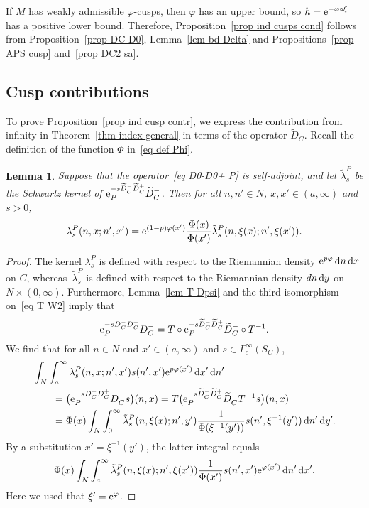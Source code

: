\documentclass[pdftex]{sigma}%
\numberwithin{equation}{section}
\newtheorem{Lemma}[Theorem]{Lemma}
\begin{document}
If $M$ has weakly admissible $\varphi$-cusps, then $\varphi$ has an upper bound, so $h = {\rm e}^{-\varphi \circ \xi}$ has a positive lower bound. Therefore,
Proposition~\ref{prop ind cusps cond} follows from
Proposition~\ref{prop DC D0}, Lemma~\ref{lem bd Delta} and Propositions~\ref{prop APS cusp} and~\ref{prop DC2 sa}.

\subsection{Cusp contributions}\label{sec cusp contr}

To prove Proposition~\ref{prop ind cusp contr}, we express the contribution from infinity in Theorem~\ref{thm index general} in terms of the operator $\widetilde{D}_C$. Recall the definition of the function $\Phi$ in~\eqref{eq def Phi}.
\begin{Lemma}\label{lem lambda lambda tilde}
Suppose that the operator~\eqref{eq D0-D0+ P} is self-adjoint, and
let $\tilde \lambda_s^{P}$ be the Schwartz kernel of ${\rm e}_P^{-s \widetilde{D}_C^- \widetilde{D}_C^+} \widetilde{D}_C^-$. Then
for all $n,n' \in N$, $x,x' \in (a, \infty)$ and $s>0$,
\[
\lambda_s^{P}(n, x; n', x') = {\rm e}^{(1-p)\varphi(x')} \frac{\Phi(x)}{\Phi(x')} \tilde \lambda_s^{P}(n, \xi(x); n', \xi(x')).
\]
\end{Lemma}
\begin{proof}
The kernel $ \lambda_s^{P}$ is defined with respect to the Riemannian density ${\rm e}^{p\varphi}\, {\rm d}n \, {\rm d}x$ on $C$, whereas~$\tilde \lambda_s^{P}$ is defined with respect to the Riemannian density $dn \, {\rm d}y$ on $N \times (0, \infty)$. Furthermore, Lemma~\ref{lem T Dpsi} and the third isomorphism on~\eqref{eq T W2} imply that
\[
{\rm e}_P^{-s D_C^- D_C^+}D_C^- =
 T \circ {\rm e}_P^{-s \widetilde{D}_C^- \widetilde{D}_C^+} \widetilde{D}_C^-\circ T^{-1}.
\]
We find that for all $n \in N$ and $x' \in (a,\infty)$ and $s \in \Gamma^{\infty}_c(S_C)$,
\begin{align*}
\begin{split}
&\int_N \int_a^{\infty} \lambda_s^{P}(n, x; n', x') s(n', x') {\rm e}^{p\varphi(x')}\, {\rm d}x' \, {\rm d}n' \\
&\qquad{}= \bigl({\rm e}_P^{-s D_C^- D_C^+}D_C^-s \bigr)(n, x)
= T \bigl({\rm e}_P^{-s \widetilde{D}_C^- \widetilde{D}_C^+} \widetilde{D}_C^- T^{-1}s \bigr)(n, x)
\\
&\qquad{}= \Phi(x) \int_N \int_0^{\infty} \tilde \lambda_s^{P}(n, \xi(x); n', y') \frac{1}{\Phi(\xi^{-1}(y'))} s(n', \xi^{-1}(y'))
\, {\rm d}n'\, {\rm d}y'.
\end{split}
\end{align*}
By a substitution $x' = \xi^{-1}(y')$, the latter integral equals
\[
 \Phi(x) \int_N \int_a^{\infty} \tilde \lambda_s^{P}(n, \xi(x); n', \xi(x')) \frac{1}{\Phi(x')} s(n', x') {\rm e}^{\varphi(x')}
\, {\rm d}n'\, {\rm d}x'.
\]
Here we used that $\xi' = {\rm e}^{\varphi}$.
\end{proof}
\end{document}

